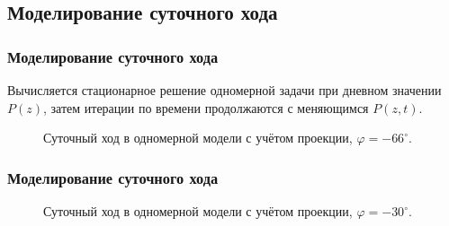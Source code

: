 \documentclass[9pt, apectratio=43,unicode]{beamer}
\begin{document}
\subsection{Моделирование суточного хода}
\begin{frame}\frametitle{Моделирование суточного хода}

Вычисляется стационарное решение одномерной задачи при дневном значении $P(z)$, затем итерации по времени продолжаются с меняющимся $P(z, t)$.

\begin{figure}[H]
\caption{Суточный ход в одномерной модели с учётом проекции, $\varphi = -66^\circ$.}
\end{figure}

\end{frame}

\begin{frame}\frametitle{Моделирование суточного хода}

\begin{figure}[H]
\caption{Суточный ход в одномерной модели с учётом проекции, $\varphi = -30^\circ$.}
\end{figure}

\end{frame}
\end{document}
